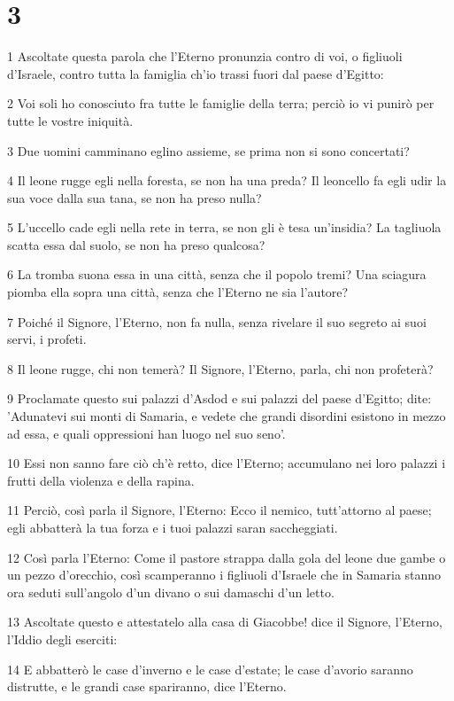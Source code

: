 \chapter{3}

\par 1 Ascoltate questa parola che l'Eterno pronunzia contro di voi, o figliuoli d'Israele, contro tutta la famiglia ch'io trassi fuori dal paese d'Egitto:
\par 2 Voi soli ho conosciuto fra tutte le famiglie della terra; perciò io vi punirò per tutte le vostre iniquità.
\par 3 Due uomini camminano eglino assieme, se prima non si sono concertati?
\par 4 Il leone rugge egli nella foresta, se non ha una preda? Il leoncello fa egli udir la sua voce dalla sua tana, se non ha preso nulla?
\par 5 L'uccello cade egli nella rete in terra, se non gli è tesa un'insidia? La tagliuola scatta essa dal suolo, se non ha preso qualcosa?
\par 6 La tromba suona essa in una città, senza che il popolo tremi? Una sciagura piomba ella sopra una città, senza che l'Eterno ne sia l'autore?
\par 7 Poiché il Signore, l'Eterno, non fa nulla, senza rivelare il suo segreto ai suoi servi, i profeti.
\par 8 Il leone rugge, chi non temerà? Il Signore, l'Eterno, parla, chi non profeterà?
\par 9 Proclamate questo sui palazzi d'Asdod e sui palazzi del paese d'Egitto; dite: 'Adunatevi sui monti di Samaria, e vedete che grandi disordini esistono in mezzo ad essa, e quali oppressioni han luogo nel suo seno'.
\par 10 Essi non sanno fare ciò ch'è retto, dice l'Eterno; accumulano nei loro palazzi i frutti della violenza e della rapina.
\par 11 Perciò, così parla il Signore, l'Eterno: Ecco il nemico, tutt'attorno al paese; egli abbatterà la tua forza e i tuoi palazzi saran saccheggiati.
\par 12 Così parla l'Eterno: Come il pastore strappa dalla gola del leone due gambe o un pezzo d'orecchio, così scamperanno i figliuoli d'Israele che in Samaria stanno ora seduti sull'angolo d'un divano o sui damaschi d'un letto.
\par 13 Ascoltate questo e attestatelo alla casa di Giacobbe! dice il Signore, l'Eterno, l'Iddio degli eserciti:
\par 14 E abbatterò le case d'inverno e le case d'estate; le case d'avorio saranno distrutte, e le grandi case spariranno, dice l'Eterno.

